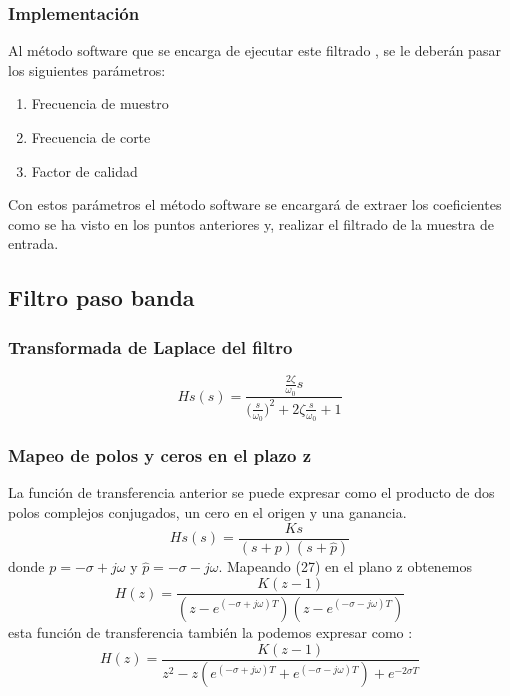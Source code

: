 \documentclass[titlepage]{article}
\begin{document}
\subsubsection{Implementación}
Al método software que se encarga de ejecutar este filtrado , se le deberán pasar los siguientes parámetros:
\begin{enumerate}
\item Frecuencia de muestro 
\item Frecuencia de corte
\item Factor de calidad
\end{enumerate}
Con estos parámetros el método software se encargará de extraer los coeficientes como se ha visto en los puntos anteriores y, realizar el filtrado de la muestra de entrada.



\subsection{Filtro paso banda}
\subsubsection{Transformada de Laplace del filtro}
\begin{equation}
Hs(s)=\frac{\displaystyle\frac{2\zeta}{\omega_0}s}{\displaystyle{(\frac{s}{\omega_0}})^2+2\zeta\frac{s}{\omega_0}+1}
\end{equation}
\subsubsection{Mapeo de polos y ceros en el plazo z}
La función de transferencia anterior se puede expresar como el producto de dos polos complejos conjugados, un cero en el origen y una ganancia.  
\begin{equation}
Hs(s)=\frac{Ks}{\displaystyle(s+p)(s+\hat{p})}
\end{equation}
donde  $p=-\sigma+j\omega$ y $\hat{p}=-\sigma-j\omega$.
Mapeando (27) en el plano z obtenemos
\begin{equation}
H(z)=\frac{K(z-1)}{\displaystyle(z-e^{(-\sigma+j\omega)T})(z-e^{(-\sigma-j\omega)T})}
\end{equation}
esta función de transferencia también la podemos expresar como :
\begin{equation}
H(z)=\frac{K(z-1)}{z^2-z(e^{(-\sigma+j\omega)T}+e^{(-\sigma-j\omega)T}) + e^{-2{\sigma}T}}
\end{equation}
\end{document}
